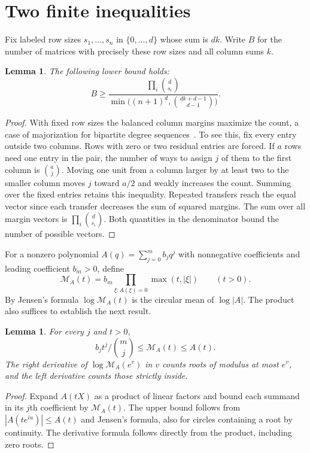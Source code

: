 \documentclass[11pt]{article}
\newtheorem{lemma}[theorem]{Lemma}
\newcommand{\M}{\mathcal{M}}
\begin{document}
\section{Two finite inequalities}
Fix labeled row sizes $s_1,\ldots,s_n$ in $\{0,\ldots,d\}$ whose sum is $dk$. Write $B$ for the number of matrices with precisely these row sizes and all column sums $k$.
\begin{lemma}\label{smooth}
The following lower bound holds:
\[
 B\ge \frac{\prod_i\binom d{s_i}}
 {\min\bigl((n+1)^d,\binom{dk+d-1}{d-1}\bigr)} .
\]
\end{lemma}
\begin{proof}
With fixed row sizes the balanced column margins maximize the count, a case of majorization for bipartite degree sequences~\cite{berger}. To see this, fix every entry outside two columns. Rows with zero or two residual entries are forced. If $a$ rows need one entry in the pair, the number of ways to assign $j$ of them to the first column is $\binom a j$. Moving one unit from a column larger by at least two to the smaller column moves $j$ toward $a/2$ and weakly increases the count. Summing over the fixed entries retains this inequality. Repeated transfers reach the equal vector since each transfer decreases the sum of squared margins. The sum over all margin vectors is $\prod_i\binom d{s_i}$. Both quantities in the denominator bound the number of possible vectors.
\end{proof}

For a nonzero polynomial $A(q)=\sum_{j=0}^m b_jq^j$ with nonnegative coefficients and leading coefficient $b_m>0$, define
\[
 \M_A(t)=b_m\prod_{\xi:A(\xi)=0}\max(t,|\xi|)\qquad(t>0).
\]
By Jensen's formula $\log\M_A(t)$ is the circular mean of $\log|A|$. The product also suffices to establish the next result.
\begin{lemma}\label{mahler}
For every $j$ and $t>0$,
\[
 b_jt^j/\binom mj\le\M_A(t)\le A(t).
\]
The right derivative of $\log\M_A(e^v)$ in $v$ counts roots of modulus at most $e^v$, and the left derivative counts those strictly inside.
\end{lemma}
\begin{proof}
Expand $A(tX)$ as a product of linear factors and bound each summand in its $j$th coefficient by $\M_A(t)$. The upper bound follows from $|A(te^{iu})|\le A(t)$ and Jensen's formula, also for circles containing a root by continuity. The derivative formula follows directly from the product, including zero roots.
\end{proof}
\end{document}
